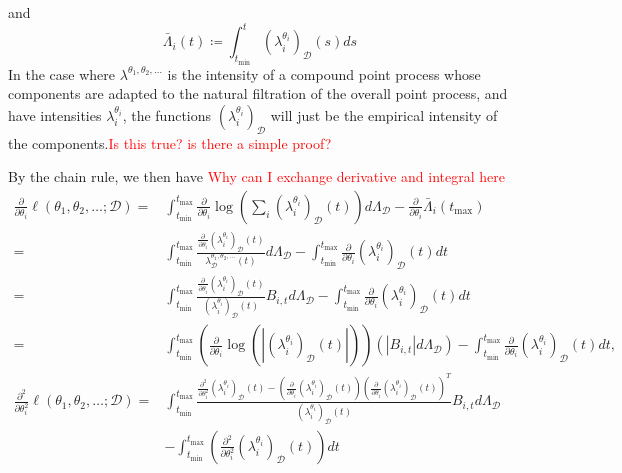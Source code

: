 \documentclass[honours,12pt]{unswthesis}
\numberwithin{equation}{section}
\begin{document}
and
$$\bar\Lambda_i(t) \coloneq \int_{t_\mathrm{min}}^t \left(\lambda_i^{\theta_i}\right)_\mathcal{D}(s)ds$$
In the case where $\lambda^{\theta_1,\theta_2,\ldots}$ is the intensity of a compound point process whose components are adapted to the natural filtration of the overall point process, and have intensities $\lambda_i^{\theta_i}$, the functions $\left(\lambda_i^{\theta_i}\right)_\mathcal{D}$ will just be the empirical intensity of the components.\textcolor{red}{Is this true? is there a simple proof?}

By the chain rule, we then have
\textcolor{red}{Why can I exchange derivative and integral here}
\begin{equation*}
	\begin{align}
		\frac{\partial}{\partial \theta_i}\ell(\theta_1,\theta_2,\ldots;\mathcal{D})
		= & \int_{t_\mathrm{min}}^{t_\mathrm{max}}\frac{\partial}{\partial\theta_i}\log\left(\sum_i \left(\lambda_i^{\theta_i}\right)_\mathcal{D}(t)\right)d\Lambda_\mathcal{D} - \frac{\partial}{\partial\theta_i}\bar\Lambda_i(t_\mathrm{max})\\
		= & \int_{t_\mathrm{min}}^{t_\mathrm{max}}\frac{\frac{\partial}{\partial\theta_i}\left(\lambda_i^{\theta_i}\right)_\mathcal{D}(t)}{\lambda^{\theta_1,\theta_2,\ldots}_\mathcal{D}(t)}d\Lambda_\mathcal{D} - \int_{t_\mathrm{min}}^{t_\mathrm{max}}\frac{\partial}{\partial\theta_i}\left(\lambda_i^{\theta_i}\right)_\mathcal{D}(t)dt\\
		= & \int_{t_\mathrm{min}}^{t_\mathrm{max}}\frac{\frac{\partial}{\partial\theta_i}\left(\lambda_i^{\theta_i}\right)_\mathcal{D}(t)}{\left(\lambda_i^{\theta_i}\right)_\mathcal{D}(t)}B_{i,t}d\Lambda_\mathcal{D} - \int_{t_\mathrm{min}}^{t_\mathrm{max}}\frac{\partial}{\partial\theta_i}\left(\lambda_i^{\theta_i}\right)_\mathcal{D}(t)dt\\
		= & \int_{t_\mathrm{min}}^{t_\mathrm{max}} \left(\frac{\partial}{\partial\theta_i}\log\left(\left\vert\left(\lambda_i^{\theta_i}\right)_\mathcal{D}(t)\right\vert\right)\right) \left(\left\vert B_{i,t}\right\vert d\Lambda_\mathcal{D}\right) - \int_{t_\mathrm{min}}^{t_\mathrm{max}}\frac{\partial}{\partial\theta_i}\left(\lambda_i^{\theta_i}\right)_\mathcal{D}(t)dt,\\
		\frac{\partial^2}{\partial \theta_i^2}\ell(\theta_1,\theta_2,\ldots;\mathcal{D})
		= & \int_{t_\mathrm{min}}^{t_\mathrm{max}} \frac{\frac{\partial^2}{\partial\theta_i^2}\left(\lambda_i^{\theta_i}\right)_\mathcal{D}(t) - \left(\frac{\partial}{\partial\theta_i}\left(\lambda_i^{\theta_i}\right)_\mathcal{D}(t)\right) \left(\frac{\partial}{\partial\theta_i}\left(\lambda_i^{\theta_i}\right)_\mathcal{D}(t)\right)^T }{\left(\lambda_i^{\theta_i}\right)_\mathcal{D}(t)} B_{i,t} d\Lambda_\mathcal{D} \\
		  & - \int_{t_\mathrm{min}}^{t_\mathrm{max}} \left(\frac{\partial^2}{\partial\theta_i^2}\left(\lambda_i^{\theta_i}\right)_\mathcal{D}(t)\right) dt\\
	\end{align}
\end{equation*}
\end{document}
